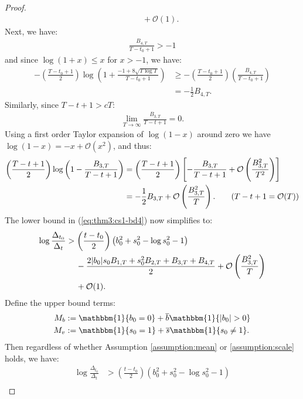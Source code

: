 \begin{proof}
\begin{align}
    &\quad\: + \mathcal{O}(1). \label{eq:thm3:cs1-bd4}
\end{align}
Next, we have:
\begin{align*}
    \frac{B_{4,T}}{T-t_0+1} > -1
\end{align*}
and since $\log(1+x) \leq x$ for $x > -1$, we have:
\begin{align*}
    -\left(\frac{T - t_0 + 1}{2}\right)\log\left(1 + \frac{-1 + 8\sqrt{T \log T}}{T-t_0+1}\right)  &\geq -\left(\frac{T - t_0+1}{2}\right) \left(\frac{B_{4,T}}{T-t_0+1}\right) \\
    &= -\frac{1}{2} B_{4,T}.
\end{align*}
Similarly, since $T-t + 1 > cT$:
\begin{align*}
    \lim_{T\to \infty} \frac{B_{3,T}}{T-t+1} = 0.
\end{align*}
Using a first order Taylor expansion of $\log(1-x)$ around zero we have $\log(1-x) = -x + \mathcal{O}(x^2)$, and thus:
\begin{align*}
    \left(\frac{T - t+1}{2}\right)\log\left(1 - \frac{B_{3,T}}{T-t+1}\right) &= \left(\frac{T - t+1}{2}\right)\left[-\frac{B_{3,T}}{T-t+1} + \mathcal{O} \left(\frac{B^2_{3,T}}{T^2}\right)\right] \\
    &= -\frac{1}{2}B_{3,T} + \mathcal{O}\left(\frac{B^2_{3,T}}{T}\right). \tag{$T-t+1 = \mathcal{O}(T)$}
\end{align*}
The lower bound in (\ref{eq:thm3:cs1-bd4}) now simplifies to: 
\begin{align*}
    \log \frac{\Delta_{t_0}}{\Delta_t} &> \left(\frac{t-t_0}{2}\right)\left(b_0^2 + s_0^2 - \log s_0^2 - 1\right) \notag \\
    &\quad\: -\frac{2| b_0| s_0 B_{1,T} + s_0^2 B_{2,T} +B_{3,T} + B_{4,T}}{2} + \mathcal{O}\left(\frac{B^2_{3,T}}{T}\right) \\
    &\quad\: + \mathcal{O}(1). 
\end{align*}
Define the upper bound terms:
\begin{align*}
    M_b &:= \mathbbm{1}\{b_0 = 0\} + \overline{b}\mathbbm{1}\{|b_0| > 0\} \\
    M_v &:= \mathbbm{1}\{s_0 = 1\} + \overline{s}\mathbbm{1}\{s_0 \neq 1\}.
\end{align*}
Then regardless of whether Assumption \ref{assumption:mean} or \ref{assumption:scale} holds, we have:
\begin{align*}
    \log \frac{\Delta_{t_0}}{\Delta_t} &> \left(\frac{t-t_0}{2}\right)\left(b_0^2 + s_0^2 - \log s_0^2 - 1\right)  \\

\end{align*}
\end{proof}
